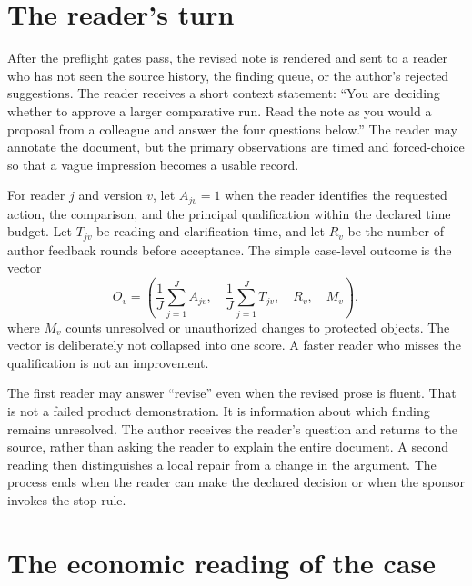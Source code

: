 \section{The reader's turn}
\label{sec:case-reader}

After the preflight gates pass, the revised note is rendered and sent to a reader who has not seen the source
history, the finding queue, or the author's rejected suggestions. The reader
receives a short context statement: ``You are deciding whether to approve a
larger comparative run. Read the note as you would a proposal from a colleague
and answer the four questions below.'' The reader may annotate the document,
but the primary observations are timed and forced-choice so that a vague
impression becomes a usable record.

For reader $j$ and version $v$, let $A_{jv}=1$ when the reader identifies the
requested action, the comparison, and the principal qualification within the
declared time budget. Let $T_{jv}$ be reading and clarification time, and let
$R_v$ be the number of author feedback rounds before acceptance. The simple
case-level outcome is the vector
\begin{equation}
  O_v = \left(\frac{1}{J}\sum_{j=1}^{J}A_{jv},\quad
              \frac{1}{J}\sum_{j=1}^{J}T_{jv},\quad R_v,\quad
              M_v\right),
  \label{eq:case-reader-outcome}
\end{equation}
where $M_v$ counts unresolved or unauthorized changes to protected objects.
The vector is deliberately not collapsed into one score. A faster reader who
misses the qualification is not an improvement.

The first reader may answer ``revise'' even when the revised prose is fluent.
That is not a failed product demonstration. It is information about which
finding remains unresolved. The author receives the reader's question and
returns to the source, rather than asking the reader to explain the entire
document. A second reading then distinguishes a local repair from a change in
the argument. The process ends when the reader can make the declared decision
or when the sponsor invokes the stop rule.

\section{The economic reading of the case}
\label{sec:case-economics}

